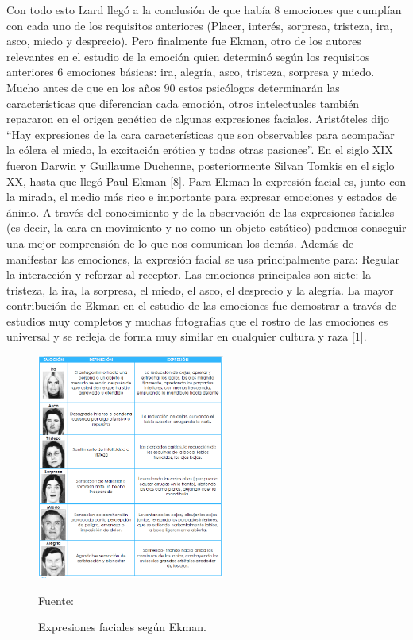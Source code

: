 Con todo esto Izard llegó a la conclusión de que había 8 emociones que cumplían con cada uno de los requisitos anteriores (Placer, interés, sorpresa, tristeza, ira, asco, miedo y desprecio). Pero finalmente fue Ekman, otro de los autores relevantes en el estudio de la emoción quien determinó según los requisitos anteriores 6 emociones básicas: ira, alegría, asco, tristeza, sorpresa y miedo.
\vskip 0.1cm
Mucho antes de que en los años 90 estos psicólogos determinarán las características que diferencian cada emoción, otros intelectuales también repararon en el origen genético de algunas expresiones faciales.
\vskip 0.1cm
Aristóteles dijo “Hay expresiones de la cara características que son observables para acompañar la cólera el miedo, la excitación erótica y todas otras pasiones”.
En el siglo XIX fueron Darwin y Guillaume Duchenne, posteriormente Silvan Tomkis en el siglo XX, hasta que llegó Paul Ekman [8].
\vskip 0.1cm
Para Ekman la expresión facial es, junto con la mirada, el medio más rico e importante para expresar emociones y estados de ánimo. A través del conocimiento y de la observación de las expresiones faciales (es decir, la cara en movimiento y no como un objeto estático) podemos conseguir una mejor comprensión de lo que nos comunican los demás. Además de manifestar las emociones, la expresión facial se usa principalmente para:  Regular la interacción y reforzar al receptor.
\vskip 0.1cm
Las emociones principales son siete: la tristeza, la ira, la sorpresa, el miedo, el asco, el desprecio y la alegría. La mayor contribución de Ekman en el estudio de las emociones fue demostrar a través de estudios muy completos y muchas fotografías que el rostro de las emociones es universal y se refleja de forma muy similar en cualquier cultura y raza [1].

\begin{figure}[ht]
\begin{center}
\includegraphics[width=0.55\textwidth]{Imagen8}
\end{center}
\begin{center}
\vskip -0.5cm
\caption{\small{Expresiones faciales según Ekman.}}
{\small{Fuente: \cite{FALTA}}}
\end{center}
\end{figure}

